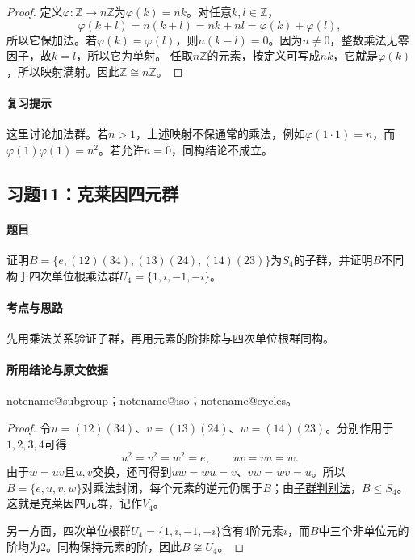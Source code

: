 \documentclass[UTF8,a4paper,11pt,fontset=windows]{ctexart}
\makeatletter
\newcommand{\Z}{\mathbb Z}\newcommand{\Q}{\mathbb Q}
\newcommand{\noteref}[1]{\hyperref[note:#1]{\csname notename@#1\endcsname}}
\newcommand{\proofref}[2]{\hyperref[note:#1]{#2}}
\newcommand{\exref}[2]{\hyperref[ex:#1:#2]{第#1章习题#2}}
\makeatother
\begin{document}

\begin{proof}
定义$\varphi:\Z\to n\Z$为$\varphi(k)=nk$。对任意$k,l\in\Z$，
\[
\varphi(k+l)=n(k+l)=nk+nl=\varphi(k)+\varphi(l),
\]
所以它保加法。若$\varphi(k)=\varphi(l)$，则$n(k-l)=0$。因为$n\ne0$，整数乘法无零因子，故$k=l$，所以它为单射。
任取$n\Z$的元素，按定义可写成$nk$，它就是$\varphi(k)$，所以映射满射。因此$\Z\cong n\Z$。
\end{proof}

\paragraph{复习提示}
这里讨论加法群。若$n>1$，上述映射不保通常的乘法，例如$\varphi(1\cdot1)=n$，而$\varphi(1)\varphi(1)=n^2$。若允许$n=0$，同构结论不成立。


\subsection{习题11：\texorpdfstring{克莱因四元群}{克莱因四元群}}
\label{ex:1:11}

\paragraph{题目}
证明$B=\{e,(12)(34),(13)(24),(14)(23)\}$为$S_4$的子群，并证明$B$不同构于四次单位根乘法群$U_4=\{1,i,-1,-i\}$。

\paragraph{考点与思路}
先用乘法关系验证子群，再用元素的阶排除与四次单位根群同构。

\paragraph{所用结论与原文依据}
\noteref{subgroup}；\noteref{iso}；\noteref{cycles}。


\begin{proof}
令$u=(12)(34)$、$v=(13)(24)$、$w=(14)(23)$。分别作用于$1,2,3,4$可得
\[
u^2=v^2=w^2=e,\qquad uv=vu=w.
\]
由于$w=uv$且$u,v$交换，还可得到$uw=wu=v$、$vw=wv=u$。所以$B=\{e,u,v,w\}$对乘法封闭，每个元素的逆元仍属于$B$；由\proofref{subgroup}{子群判别法}，$B\leq S_4$。这就是克莱因四元群，记作$V_4$。

另一方面，四次单位根群$U_4=\{1,i,-1,-i\}$含有4阶元素$i$，而$B$中三个非单位元的阶均为2。同构保持元素的阶，因此$B\not\cong U_4$。
\end{proof}
\end{document}
